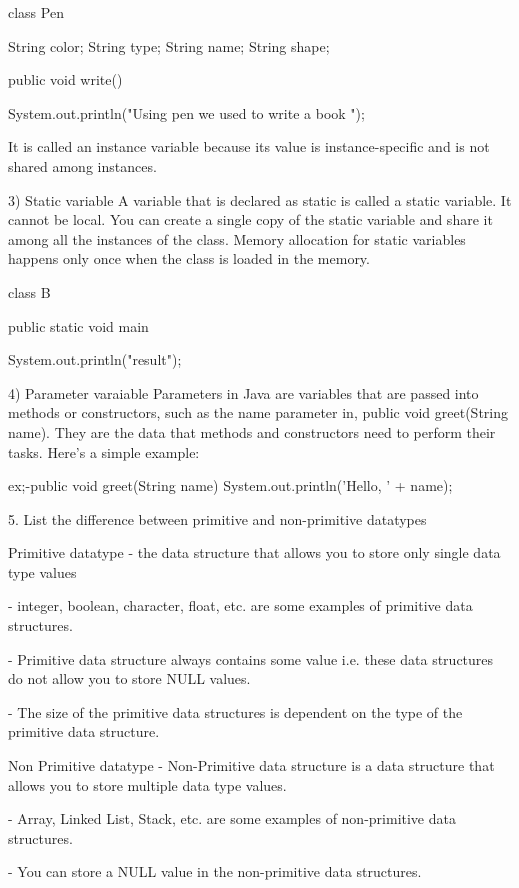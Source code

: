 class Pen{

    String color;
	String type;
	String name;
	String shape;
	
	
	public void write(){
	System.out.println("Using pen we used to write a book ");
	
	
	}


It is called an instance variable because its value is instance-specific and is not shared among instances.

3) Static variable
A variable that is declared as static is called a static variable. It cannot be local. You can create a single copy of the static variable and share it among all the instances of the class. Memory allocation for static variables happens only once when the class is loaded in the memory.

class B

public static void main {
System.out.println("result");	
	
}


4) Parameter varaiable
Parameters in Java are variables that are passed into methods or constructors, such as the name parameter in, public void greet(String name). They are the data that methods and constructors need to perform their tasks. Here’s a simple example:


ex;-public void greet(String name) {
    System.out.println('Hello, ' + name);
}


5. List the difference between primitive and non-primitive datatypes


Primitive datatype - the data structure that allows you to store only single data type values

                   - integer, boolean, character, float, etc. are some examples of primitive data structures.	

                   - Primitive data structure always contains some value i.e. these data structures do not allow you to store NULL values.	
				   
				   - The size of the primitive data structures is dependent on the type of the primitive data structure.	
				   
				   
				   
				   
Non Primitive datatype - Non-Primitive data structure is a data structure that allows you to store multiple data type values.
				   
				   
				       - Array, Linked List, Stack, etc. are some examples of non-primitive data structures.

                       - You can store a NULL value in the non-primitive data structures.

}
